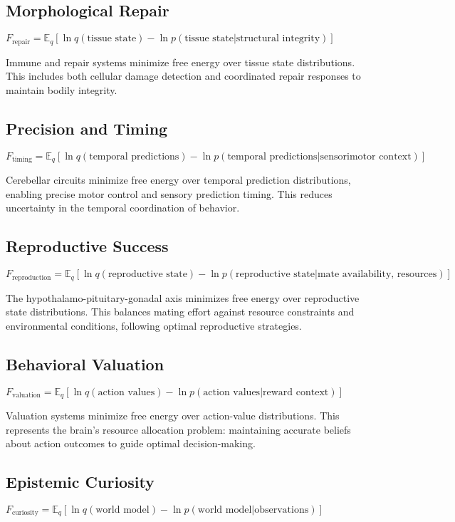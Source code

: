 \documentclass[10pt]{article}
\begin{document}
\subsection{Morphological Repair}
$F_{\text{repair}} = \mathbb{E}_q[\ln q(\text{tissue state}) - \ln p(\text{tissue state}|\text{structural integrity})]$

Immune and repair systems minimize free energy over tissue state distributions. This includes both cellular damage detection and coordinated repair responses to maintain bodily integrity.

\subsection{Precision and Timing}
$F_{\text{timing}} = \mathbb{E}_q[\ln q(\text{temporal predictions}) - \ln p(\text{temporal predictions}|\text{sensorimotor context})]$

Cerebellar circuits minimize free energy over temporal prediction distributions, enabling precise motor control and sensory prediction timing. This reduces uncertainty in the temporal coordination of behavior.

\subsection{Reproductive Success}
$F_{\text{reproduction}} = \mathbb{E}_q[\ln q(\text{reproductive state}) - \ln p(\text{reproductive state}|\text{mate availability, resources})]$

The hypothalamo-pituitary-gonadal axis minimizes free energy over reproductive state distributions. This balances mating effort against resource constraints and environmental conditions, following optimal reproductive strategies.

\subsection{Behavioral Valuation}
$F_{\text{valuation}} = \mathbb{E}_q[\ln q(\text{action values}) - \ln p(\text{action values}|\text{reward context})]$

Valuation systems minimize free energy over action-value distributions. This represents the brain's resource allocation problem: maintaining accurate beliefs about action outcomes to guide optimal decision-making.

\subsection{Epistemic Curiosity}
$F_{\text{curiosity}} = \mathbb{E}_q[\ln q(\text{world model}) - \ln p(\text{world model}|\text{observations})]$
\end{document}
